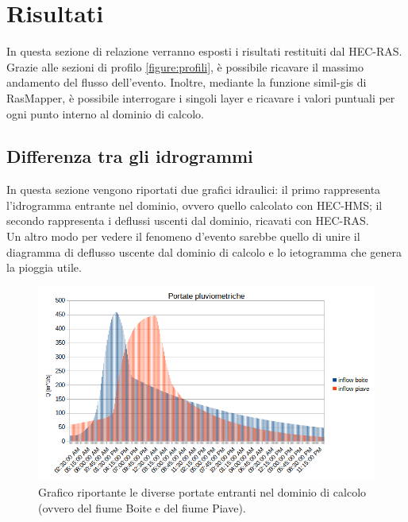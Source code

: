 \section{Risultati}
In questa sezione di relazione verranno esposti i risultati restituiti dal HEC-RAS.\\
Grazie alle sezioni di profilo \eqref{figure:profili}, è possibile ricavare il massimo andamento del flusso dell'evento. Inoltre, mediante la funzione simil-gis di RasMapper, è possibile interrogare i singoli layer e ricavare i valori puntuali per ogni punto interno al dominio di calcolo.

\subsection{Differenza tra gli idrogrammi}
In questa sezione vengono riportati due grafici idraulici: il primo rappresenta l'idrogramma entrante nel dominio, ovvero quello calcolato con HEC-HMS; il secondo rappresenta i deflussi uscenti dal dominio, ricavati con HEC-RAS.\\
Un altro modo per vedere il fenomeno d'evento sarebbe quello di unire il diagramma di deflusso uscente dal dominio di calcolo e lo ietogramma che genera la pioggia utile.
\begin{figure}[H] \centering
    \includegraphics[scale=0.6]{immagini/portate_pluviometriche.png}
    \caption{Grafico riportante le diverse portate entranti nel dominio di calcolo (ovvero del fiume Boite e del fiume Piave).}
    \label{figure:portate_pluviometriche}
\end{figure}

